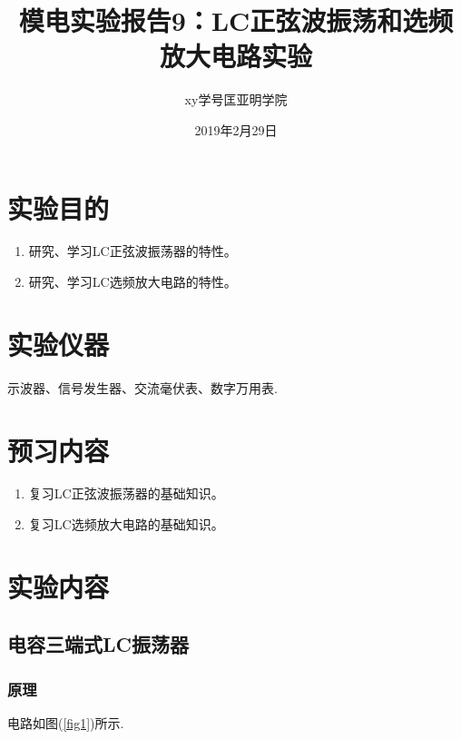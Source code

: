 \documentclass[a4paper]{article}
\title{模电实验报告9：LC正弦波振荡和选频放大电路实验}
\author{xy\quad 学号\quad 匡亚明学院}
\date{2019年2月29日}
\begin{document}
\maketitle


\section{实验目的}
\begin{enumerate}
\item 研究、学习LC正弦波振荡器的特性。
\item 研究、学习LC选频放大电路的特性。
\end{enumerate}

\section{实验仪器}
示波器、信号发生器、交流毫伏表、数字万用表.

\section{预习内容}
\begin{enumerate}
\item 复习LC正弦波振荡器的基础知识。
\item 复习LC选频放大电路的基础知识。
\end{enumerate}

\section{实验内容}
\subsection{电容三端式LC振荡器}
\subsubsection{原理}
电路如图(\ref{fig1})所示.
\end{document}
